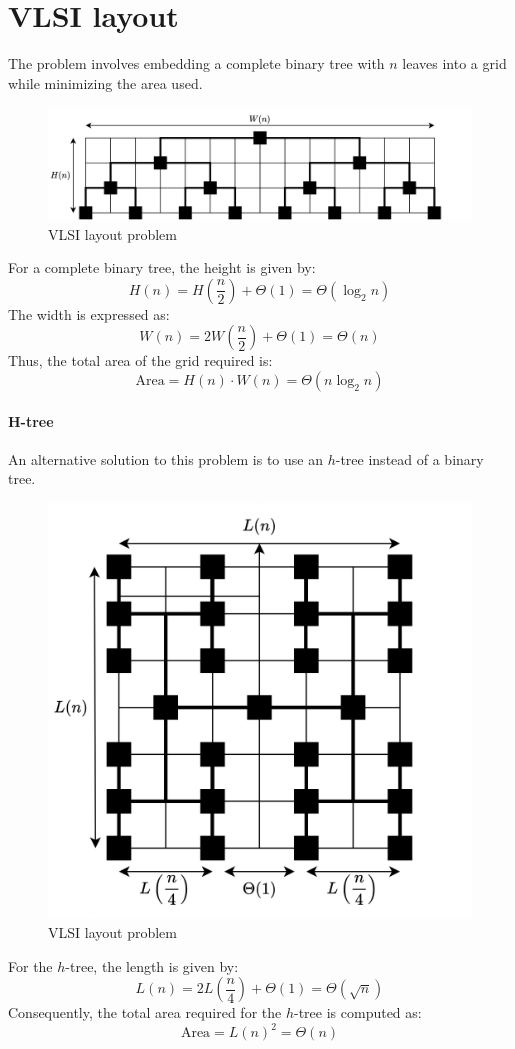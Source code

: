 \section{VLSI layout}

The problem involves embedding a complete binary tree with $n$ leaves into a grid while minimizing the area used.
\begin{figure}[H]
    \centering
    \includegraphics[width=0.9\linewidth]{images/vlsi.png}
    \caption{VLSI layout problem}
\end{figure}
For a complete binary tree, the height is given by:
\[H(n)=H\left(\dfrac{n}{2}\right)+\Theta(1)=\Theta(\log_2n)\]
The width is expressed as:
\[W(n)=2W\left(\dfrac{n}{2}\right)+\Theta(1)=\Theta(n)\]
Thus, the total area of the grid required is:
\[\text{Area}=H(n)\cdot W(n)=\Theta(n\log_2n)\]

\paragraph*{H-tree}
An alternative solution to this problem is to use an $h$-tree instead of a binary tree.
\begin{figure}[H]
    \centering
    \includegraphics[width=0.55\linewidth]{images/vlsi1.png}
    \caption{VLSI layout problem}
\end{figure}
For the $h$-tree, the length is given by:
\[L(n)=2L\left(\dfrac{n}{4}\right)+\Theta(1)=\Theta(\sqrt{n})\]
Consequently, the total area required for the $h$-tree is computed as:
\[\text{Area}=L(n)^2=\Theta(n)\]